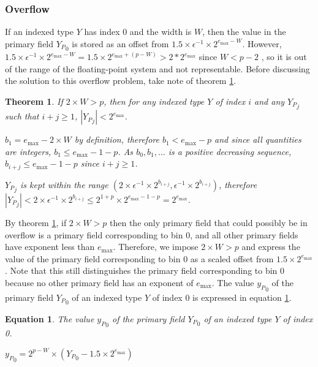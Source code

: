 \documentclass[12pt]{article}
\providecommand{\max}{\ensuremath{\text{max}}}
\theoremstyle{plain}
\newtheorem{thm}{Theorem}[section]
\newtheorem{eq}{Equation}[section]
\begin{document}
    \subsubsection{Overflow}
      \label{sec:overflow}
      If an indexed type $Y$ has index 0 and the width is $W$, then the value in the primary field ${Y_P}_0$ is stored as an offset from $1.5\times\epsilon^{-1}\times2^{e_{\max} - W}$. However, $1.5\times\epsilon^{-1}\times2^{e_{\max} - W} = 1.5 \times 2^{e_{\max} + (p - W)} > 2 * 2^{e_{\max}}$ since $W < p - 2$ \cite{repsum}, so it is out of the range of the floating-point system and not representable. Before discussing the solution to this overflow problem, take note of theorem \ref{thm:overflow}.
      \begin{thm}
        If $2\times W > p$, then for any indexed type $Y$ of index $i$ and any ${Y_P}_j$ such that $i + j \geq 1$, $|{Y_P}_j| < 2^{e_{\max}}$.

        $b_1 = e_{\max} - 2\times W$ by definition, therefore $b_1 < e_{\max} - p$ and since all quantities are integers, $b_1 \leq e_{\max} - 1 - p$. As $b_0, b_1, ...$ is a positive decreasing sequence, $b_{i + j} \leq e_{\max} - 1 - p$ since $i + j \geq 1$.

        ${Y_P}_j$ is kept within the range $(2 \times \epsilon^{-1} \times 2^{b_{i + j}}, \epsilon^{-1} \times 2^{b_{i + j}})$, therefore 
        $|{Y_P}_j| < 2 \times \epsilon^{-1} \times 2^{b_{i + j}} \leq 2^{1 + p} \times 2^{e_{\max} - 1 - p} = 2^{e_{\max}}$.

        \label{thm:overflow}
      \end{thm}
      By theorem \ref{thm:overflow}, if $2\times W > p$ then the only primary field that could possibly be in overflow is a primary field corresponding to bin 0, and all other primary fields have exponent less than $e_{\max}$. Therefore, we impose $2\times W > p$ and express the value of the primary field corresponding to bin 0 as a scaled offset from $1.5\times2^{e_{\max}}$. Note that this still distinguishes the primary field corresponding to bin 0 because no other primary field has an exponent of $e_{\max}$. The value ${y_P}_0$ of the primary field ${Y_P}_0$ of an indexed type $Y$ of index 0 is expressed in equation \ref{eq:pri0}.
      \begin{eq} The value ${y_P}_0$ of the primary field ${Y_P}_0$ of an indexed type $Y$ of index 0.

        ${y_P}_0 = 2^{p - W}\times({Y_P}_0 - 1.5\times2^{e_{\max}})$
        \label{eq:pri0}
      \end{eq}
\end{document}
